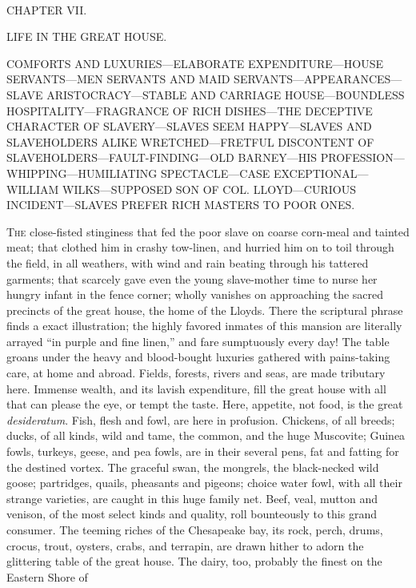 {\protect\hypertarget{107}{}{}}

~

{CHAPTER VII.}

LIFE IN THE GREAT HOUSE.

{COMFORTS AND LUXURIES---ELABORATE EXPENDITURE---HOUSE SERVANTS---MEN
SERVANTS AND MAID SERVANTS---APPEARANCES---SLAVE ARISTOCRACY---STABLE
AND CARRIAGE HOUSE---BOUNDLESS HOSPITALITY---FRAGRANCE OF RICH
DISHES---THE DECEPTIVE CHARACTER OF SLAVERY---SLAVES SEEM HAPPY---SLAVES
AND SLAVEHOLDERS ALIKE WRETCHED---FRETFUL DISCONTENT OF
SLAVEHOLDERS---FAULT-FINDING---OLD BARNEY---HIS
PROFESSION---WHIPPING---HUMILIATING SPECTACLE---CASE
EXCEPTIONAL---WILLIAM WILKS---SUPPOSED SON OF COL. LLOYD---CURIOUS
INCIDENT---SLAVES PREFER RICH MASTERS TO POOR ONES.}

\textsc{The} close-fisted stinginess that fed the poor slave on coarse
corn-meal and tainted meat; that clothed him in crashy tow-linen, and
hurried him on to toil through the field, in all weathers, with wind and
rain beating through his tattered garments; that scarcely gave even the
young slave-mother time to nurse her hungry infant in the fence corner;
wholly vanishes on approaching the sacred precincts of the great house,
the home of the Lloyds. There the scriptural phrase finds a exact
illustration; the highly favored inmates of this mansion are literally
arrayed ``in purple and fine linen,'' and fare sumptuously every day!
The table groans under the heavy and blood-bought luxuries gathered with
pains-taking care, at home and abroad. Fields, forests, rivers and seas,
are made tributary here. Immense wealth, and its lavish expenditure,
fill the great house with all that can please the
{\protect\hypertarget{108}{}{}}eye, or tempt the taste. Here, appetite,
not food, is the great \emph{desideratum}. Fish, flesh and fowl, are
here in profusion. Chickens, of all breeds; ducks, of all kinds, wild
and tame, the common, and the huge Muscovite; Guinea fowls, turkeys,
geese, and pea fowls, are in their several pens, fat and fatting for the
destined vortex. The graceful swan, the mongrels, the black-necked wild
goose; partridges, quails, pheasants and pigeons; choice water fowl,
with all their strange varieties, are caught in this huge family net.
Beef, veal, mutton and venison, of the most select kinds and quality,
roll bounteously to this grand consumer. The teeming riches of the
Chesapeake bay, its rock, perch, drums, crocus, trout, oysters, crabs,
and terrapin, are drawn hither to adorn the glittering table of the
great house. The dairy, too, probably the finest on the Eastern Shore of
